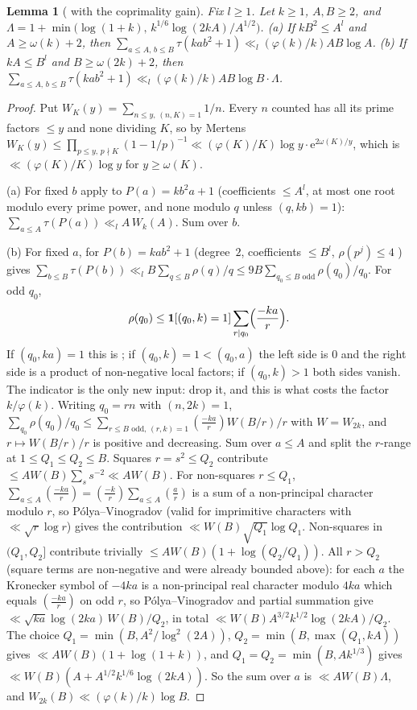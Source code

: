 \documentclass[10pt,reqno]{amsart}
\newtheorem{lemma}[theorem]{Lemma}
\theoremstyle{definition}
\newcommand{\ind}{\mathbf 1}
\newcommand{\e}{\mathrm e}
\begin{document}
\begin{lemma}[{\cite[Prop.~1.4]{ET}} with the coprimality gain]\label{lem:ETPV}
Fix $l\geq1$.  Let $k\geq1$, $A,B\geq2$, and
$\Lambda=1+\min\bigl(\log(1+k),\,k^{1/6}\log(2kA)/A^{1/2}\bigr)$.
\textup{(a)} If $kB^2\leq A^l$ and $A\geq\omega(k)+2$, then
$\sum_{a\leq A,\,b\leq B}\tau(kab^2+1)\ll_l(\varphi(k)/k)AB\log A$.
\textup{(b)} If $kA\leq B^l$ and $B\geq\omega(2k)+2$, then
$\sum_{a\leq A,\,b\leq B}\tau(kab^2+1)\ll_l(\varphi(k)/k)AB\log B\cdot\Lambda$.
\end{lemma}

\begin{proof}
Put $W_K(y)=\sum_{n\leq y,\,(n,K)=1}1/n$.  Every $n$ counted has all its
prime factors $\leq y$ and none dividing $K$, so by Mertens
$W_K(y)\leq\prod_{p\leq y,\,p\nmid K}(1-1/p)^{-1}\ll(\varphi(K)/K)\log y\cdot\e^{2\omega(K)/y}$,
which is $\ll(\varphi(K)/K)\log y$ for $y\geq\omega(K)$.

(a) For fixed $b$ apply \cite[Thm.~7.1]{ET} to $P(a)=kb^2a+1$
(coefficients $\leq A^l$, at most one root modulo every prime power, and
none modulo $q$ unless $(q,kb)=1$): $\sum_{a\leq A}\tau(P(a))\ll_lA\,W_k(A)$.
Sum over $b$.

(b) For fixed $a$, \cite[Thm.~7.1]{ET} for $P(b)=kab^2+1$ (degree~$2$,
coefficients $\leq B^l$, $\rho(p^j)\leq4$ \cite[p.~30]{ET}) gives
$\sum_{b\leq B}\tau(P(b))\ll_lB\sum_{q\leq B}\rho(q)/q
\leq9B\sum_{q_0\leq B\text{ odd}}\rho(q_0)/q_0$.  For odd $q_0$,
\[
 \rho(q_0)\leq\ind[(q_0,k)=1]\sum_{r\mid q_0}\Bigl(\frac{-ka}r\Bigr).
\]
If $(q_0,ka)=1$ this is \cite[p.~31]{ET}; if $(q_0,k)=1<(q_0,a)$ the left
side is $0$ and the right side is a product of non-negative local
factors; if $(q_0,k)>1$ both sides vanish.  The indicator is the only new
input: \cite{ET} drop it, and this is what costs the factor
$k/\varphi(k)$.  Writing $q_0=rn$ with $(n,2k)=1$,
$\sum_{q_0}\rho(q_0)/q_0\leq\sum_{r\leq B\text{ odd},\,(r,k)=1}(\frac{-ka}r)W(B/r)/r$
with $W=W_{2k}$, and $r\mapsto W(B/r)/r$ is positive and decreasing.  Sum
over $a\leq A$ and split the $r$-range at $1\leq Q_1\leq Q_2\leq B$.
Squares $r=s^2\leq Q_2$ contribute $\leq AW(B)\sum_ss^{-2}\ll AW(B)$.
For non-squares $r\leq Q_1$,
$\sum_{a\leq A}(\frac{-ka}r)=(\frac{-k}r)\sum_{a\leq A}(\frac ar)$ is a sum
of a non-principal character modulo $r$, so P\'olya--Vinogradov (valid
for imprimitive characters with $\ll\sqrt r\log r$) gives the
contribution $\ll W(B)\sqrt{Q_1}\log Q_1$.  Non-squares in $(Q_1,Q_2]$
contribute trivially $\leq AW(B)(1+\log(Q_2/Q_1))$.  All $r>Q_2$ (square
terms are non-negative and were already bounded above): for each $a$ the
Kronecker symbol of $-4ka$ is a non-principal real character modulo
$4ka$ which equals $(\frac{-ka}r)$ on odd $r$, so P\'olya--Vinogradov and
partial summation give $\ll\sqrt{ka}\log(2ka)\,W(B)/Q_2$, in total
$\ll W(B)A^{3/2}k^{1/2}\log(2kA)/Q_2$.  The choice
$Q_1=\min(B,A^2/\log^2(2A))$, $Q_2=\min(B,\max(Q_1,kA))$ gives
$\ll AW(B)(1+\log(1+k))$, and $Q_1=Q_2=\min(B,Ak^{1/3})$ gives
$\ll W(B)(A+A^{1/2}k^{1/6}\log(2kA))$.  So the sum over $a$ is
$\ll AW(B)\Lambda$, and $W_{2k}(B)\ll(\varphi(k)/k)\log B$.
\end{proof}
\end{document}
